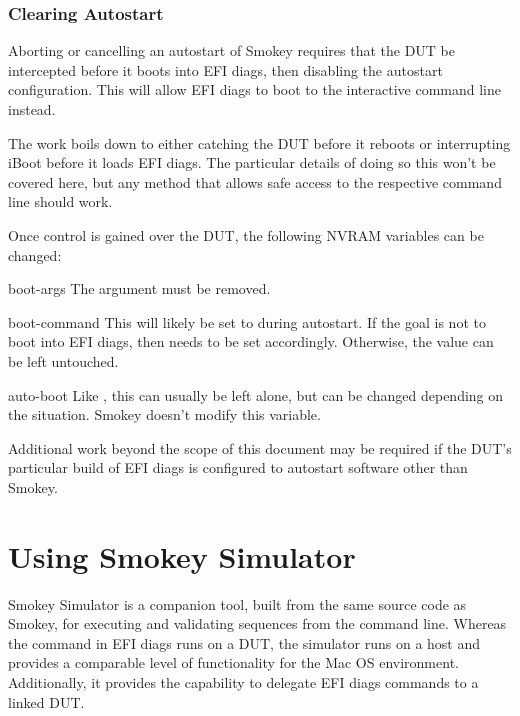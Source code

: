 \subsubsection{Clearing Autostart}
\label{sec:ClearingAutostart}

Aborting or cancelling an autostart of Smokey requires that the DUT be
intercepted before it boots into EFI diags, then disabling the autostart
configuration.  This will allow EFI diags to boot to the interactive command
line instead.

The work boils down to either catching the DUT before it reboots or
interrupting iBoot before it loads EFI diags.  The particular details of doing
so this won't be covered here, but any method that allows safe access to the
respective command line should work.

Once control is gained over the DUT, the following NVRAM variables can be
changed:

\begin{Descriptive}

	\item[boot-args] The  argument must be removed.

	\item[boot-command] This will likely be set to  during
	autostart. If the goal is not to boot into EFI diags, then
	 needs to be set accordingly.  Otherwise, the value
	can be left untouched.

	\item[auto-boot] Like , this can usually be left
	alone, but can be changed depending on the situation.  Smokey doesn't
	modify this variable.

\end{Descriptive}

Additional work beyond the scope of this document may be required if the DUT's
particular build of EFI diags is configured to autostart software other than
Smokey.


\section{Using Smokey Simulator}

Smokey Simulator is a companion tool, built from the same source code as
Smokey, for executing and validating sequences from the command line.  Whereas
the  command in EFI diags runs on a DUT, the simulator runs on
a host and provides a comparable level of functionality for the Mac OS
environment.  Additionally, it provides the capability to delegate EFI diags
commands to a linked DUT.

